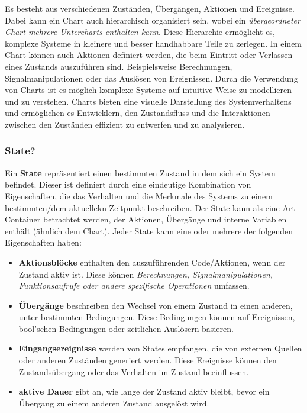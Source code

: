 \documentclass{article}
\begin{document}
		\begin{multicols}{2}
		\renewcommand{\thesubsection}{\alph{subsection})}
				Es besteht aus verschiedenen Zuständen, Übergängen, Aktionen und Ereignisse.
				Dabei kann ein Chart auch hierarchisch organisiert sein, wobei ein \textit{übergeordneter Chart mehrere Untercharts enthalten kann}. Diese Hierarchie ermöglicht es, komplexe Systeme in kleinere und besser handhabbare Teile zu zerlegen.
				In einem Chart können auch Aktionen definiert werden, die beim Eintritt oder Verlassen eines Zustands auszuführen sind. Beispielsweise Berechnungen, Signalmanipulationen oder das Auslösen von Ereignissen.
 				Durch die Verwendung von Charts ist es möglich komplexe Systeme auf intuitive Weise zu modellieren und zu verstehen. Charts bieten eine visuelle Darstellung des Systemverhaltens und ermöglichen es Entwicklern, den Zustandsfluss und die Interaktionen zwischen den Zuständen effizient zu entwerfen und zu analysieren.
			\subsubsection{State?}
				Ein \textbf{State} repräsentiert einen bestimmten Zustand in dem sich ein System befindet. Dieser ist definiert durch eine eindeutige Kombination von Eigenschaften, die das Verhalten und die Merkmale des Systems zu einem bestimmten/dem aktuellekn Zeitpunkt beschreiben. 
				Der State kann als eine Art Container betrachtet werden, der Aktionen, Übergänge und interne Variablen enthält (ähnlich dem Chart).
				Jeder State kann eine oder mehrere der folgenden Eigenschaften haben:
				\begin{itemize}
					\item \textbf{Aktionsblöcke} enthalten den auszuführenden Code/Aktionen, wenn der Zustand aktiv ist. Diese können \textit{Berechnungen, Signalmanipulationen, Funktionsaufrufe oder andere spezifische Operationen} umfassen.
					\item \textbf{Übergänge} beschreiben den Wechsel von einem Zustand in einen anderen, unter bestimmten Bedingungen. Diese Bedingungen können auf Ereignissen, bool'schen Bedingungen oder zeitlichen Auslösern basieren.
					\item \textbf{Eingangsereignisse} werden von States empfangen, die von externen Quellen oder anderen Zuständen generiert werden. Diese Ereignisse können den Zustandsübergang oder das Verhalten im Zustand beeinflussen.
					\item \textbf{aktive Dauer} gibt an, wie lange der Zustand aktiv bleibt, bevor ein Übergang zu einem anderen Zustand ausgelöst wird.
				\end{itemize}

\end{multicols}
\end{document}
